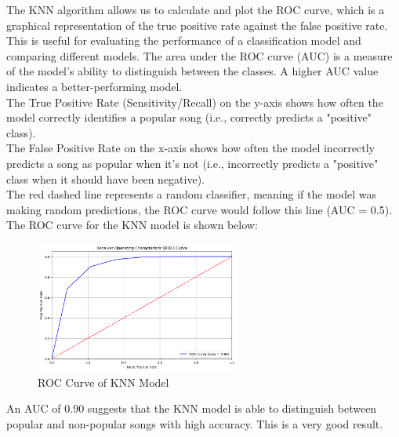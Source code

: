 \newpage

The KNN algorithm allows us to calculate and plot the ROC curve, which is a graphical representation of the true positive rate against the false positive rate. This is useful for evaluating the performance of a classification model and comparing different models. The area under the ROC curve (AUC) is a measure of the model's ability to distinguish between the classes. A higher AUC value indicates a better-performing model.\\
The True Positive Rate (Sensitivity/Recall) on the y-axis shows how often the model correctly identifies a popular song (i.e., correctly predicts a "positive" class).\\
The False Positive Rate on the x-axis shows how often the model incorrectly predicts a song as popular when it's not (i.e., incorrectly predicts a "positive" class when it should have been negative).\\
The red dashed line represents a random classifier, meaning if the model was making random predictions, the ROC curve would follow this line (AUC = 0.5).\\
The ROC curve for the KNN model is shown below:

\begin{figure} [H]
    \centering
    \includegraphics[width=0.6\textwidth]{media/roc_curve.png}
    \caption{ROC Curve of KNN Model}
    \label{fig:knn_roc_curve}
\end{figure}

An AUC of 0.90 suggests that the KNN model is able to distinguish between popular and non-popular songs with high accuracy. This is a very good result.